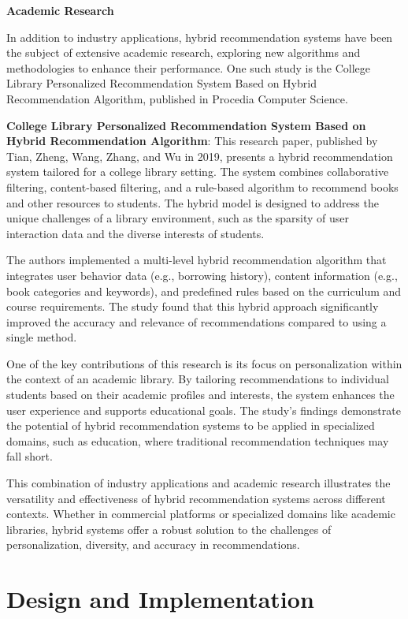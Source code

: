 \documentclass{article}
\begin{document}
\textbf{Academic Research}

In addition to industry applications, hybrid recommendation systems have been the subject of extensive academic research, exploring new algorithms and methodologies to enhance their performance. One such study is the College Library Personalized Recommendation System Based on Hybrid Recommendation Algorithm, published in Procedia Computer Science.

\textbf{College Library Personalized Recommendation System Based on Hybrid Recommendation Algorithm}: This research paper, published by Tian, Zheng, Wang, Zhang, and Wu in 2019, presents a hybrid recommendation system tailored for a college library setting. The system combines collaborative filtering, content-based filtering, and a rule-based algorithm to recommend books and other resources to students. The hybrid model is designed to address the unique challenges of a library environment, such as the sparsity of user interaction data and the diverse interests of students.

The authors implemented a multi-level hybrid recommendation algorithm that integrates user behavior data (e.g., borrowing history), content information (e.g., book categories and keywords), and predefined rules based on the curriculum and course requirements. The study found that this hybrid approach significantly improved the accuracy and relevance of recommendations compared to using a single method.

One of the key contributions of this research is its focus on personalization within the context of an academic library. By tailoring recommendations to individual students based on their academic profiles and interests, the system enhances the user experience and supports educational goals. The study's findings demonstrate the potential of hybrid recommendation systems to be applied in specialized domains, such as education, where traditional recommendation techniques may fall short.

This combination of industry applications and academic research illustrates the versatility and effectiveness of hybrid recommendation systems across different contexts. Whether in commercial platforms or specialized domains like academic libraries, hybrid systems offer a robust solution to the challenges of personalization, diversity, and accuracy in recommendations.

\section{Design and Implementation}
\end{document}
